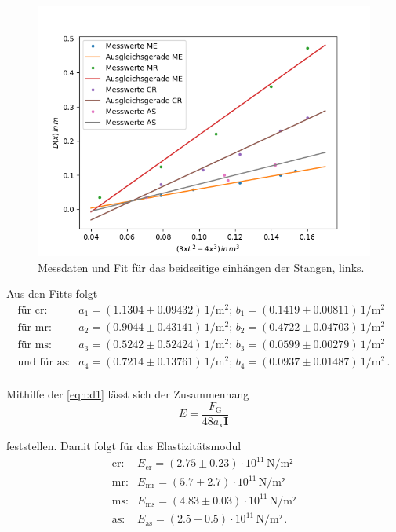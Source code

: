 \begin{figure}[H]
	\centering
	\includegraphics{Daten/AS2_l.png}
	\caption{Messdaten und Fit für das beidseitige einhängen der Stangen, links.}
	\label{fig:links}
\end{figure}

\noindent
Aus den Fitts folgt
\begin{align*}
    \text{für cr}:& a_1 = (1.1304 \pm 0.09432) \, \si{1\per\meter^2} ; \, b_1 = (0.1419 \pm 0.00811) \, \si{1\per\meter^2}  \\
    \text{für mr}:& a_2 = (0.9044 \pm 0.43141) \, \si{1\per\meter^2} ; \, b_2 = (0.4722 \pm 0.04703) \, \si{1\per\meter^2} \\
    \text{für ms}:& a_3 = (0.5242 \pm 0.52424) \, \si{1\per\meter^2} ; \, b_3 = (0.0599 \pm 0.00279) \, \si{1\per\meter^2}\\
\text{und für as}:& a_4 = (0.7214 \pm 0.13761) \, \si{1\per\meter^2} ;\,  b_4 = (0.0937 \pm 0.01487) \, \si{1\per\meter^2} \, .\\
\end{align*} 

\noindent
Mithilfe der \autoref{eqn:d1} lässt sich der Zusammenhang 
\begin{equation*}
    E = \frac{F_\text{G}}{48a_\text{x}\symbf{I}}
\end{equation*}

\noindent
feststellen. Damit folgt für das Elastizitätsmodul
\begin{align*}
    \text{cr}:& E_\text{cr} = (2.75 \pm 0.23) \cdot 10^{11}   \, \si{\newton\per\meter²}\\
    \text{mr}:& E_\text{mr} = (5.7 \pm 2.7) \cdot 10^{11} \, \si{\newton\per\meter²}\\
    \text{ms}:& E_\text{ms} = (4.83 \pm 0.03) \cdot 10^{11} \, \si{\newton\per\meter²} \\
    \text{as}:& E_\text{as} = (2.5\pm 0.5) \cdot 10^{11} \, \si{\newton\per\meter²} \, .\\
\end{align*} 

